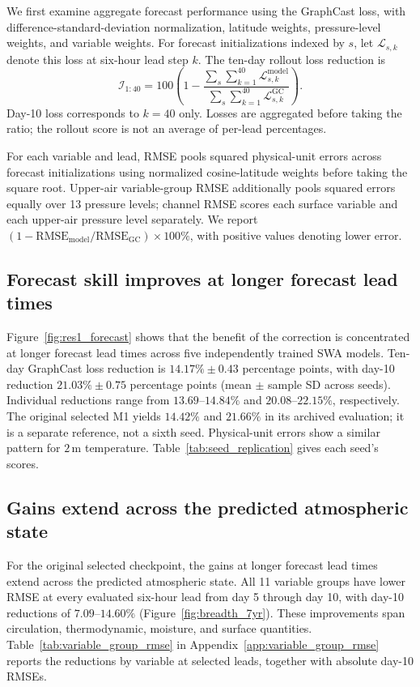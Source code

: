 \documentclass{article}
\newcommand{\vfourchange}[1]{{\color{blue}#1}}
\begin{document}
We first examine aggregate forecast performance using the {GraphCast loss}, with difference-standard-deviation normalization, latitude weights, pressure-level weights, and variable weights. For forecast initializations indexed by $s$, let $\mathcal{L}_{s,k}$ denote this loss at six-hour lead step $k$. The ten-day rollout loss reduction is
\begin{equation}
    \mathcal{I}_{1:40}=100\left(1-
    \frac{\sum_s\sum_{k=1}^{40}\mathcal{L}^{\mathrm{model}}_{s,k}}
         {\sum_s\sum_{k=1}^{40}\mathcal{L}^{\mathrm{GC}}_{s,k}}\right).
    \label{eq:v3_loss_reduction}
\end{equation}
Day-10 loss corresponds to $k=40$ only. Losses are aggregated before taking the ratio; the rollout score is not an average of per-lead percentages.

For each variable and lead, RMSE pools squared physical-unit errors across forecast initializations using normalized cosine-latitude weights before taking the square root. Upper-air variable-group RMSE additionally pools squared errors equally over 13 pressure levels; channel RMSE scores each surface variable and each upper-air pressure level separately. We report $(1-\mathrm{RMSE}_{\mathrm{model}}/\mathrm{RMSE}_{\mathrm{GC}})\times 100\%$, with positive values denoting lower error.

\subsection{Forecast skill improves at longer forecast lead times}

Figure~\ref{fig:res1_forecast} shows that the benefit of the correction is concentrated at longer forecast lead times\vfourchange{ across five independently trained SWA models}. \vfourchange{Ten-day GraphCast loss reduction is $14.17\%\pm0.43$ percentage points, with day-10 reduction $21.03\%\pm0.75$ percentage points (mean $\pm$ sample SD across seeds). Individual reductions range from $13.69$--$14.84\%$ and $20.08$--$22.15\%$, respectively. The original selected M1 yields $14.42\%$ and $21.66\%$ in its archived evaluation; it is a separate reference, not a sixth seed.} Physical-unit errors show a similar pattern\vfourchange{ for $2$\,m temperature}. \vfourchange{Table~\ref{tab:seed_replication} gives each seed's scores.}




\subsection{Gains extend across the predicted atmospheric state}
\vfourchange{For the original selected checkpoint,} the gains at longer forecast lead times extend across the predicted atmospheric state. All 11 variable groups have lower RMSE at every evaluated six-hour lead from day 5 through day 10, with day-10 reductions of \vfourchange{$7.09$--$14.60\%$} (Figure~\ref{fig:breadth_7yr}). These improvements span circulation, thermodynamic, moisture, and surface quantities. Table~\ref{tab:variable_group_rmse} in Appendix~\ref{app:variable_group_rmse} reports the reductions by variable at selected leads, together with absolute day-10 RMSEs.
\end{document}
